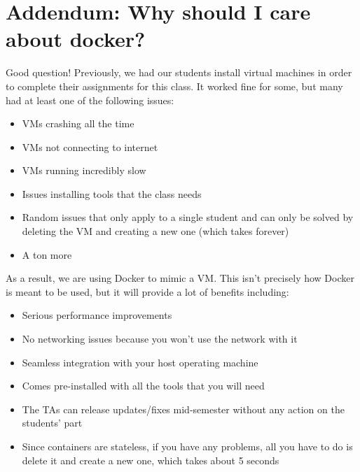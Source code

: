 \section{Addendum: Why should I care about docker?}

Good question! Previously, we had our students install virtual machines in order to complete their assignments for this class. It worked fine for some, but many had at least one of the following issues:

\begin{itemize}
  \item VMs crashing all the time
  \item VMs not connecting to internet
  \item VMs running incredibly slow
  \item Issues installing tools that the class needs
  \item Random issues that only apply to a single student and can only be solved by deleting the VM and creating a new one (which takes forever)
  \item A ton more
\end{itemize}

As a result, we are using Docker to mimic a VM. This isn't precisely how Docker is meant to be used, but it will provide a lot of benefits including:

\begin{itemize}
  \item Serious performance improvements
  \item No networking issues because you won’t use the network with it
  \item Seamless integration with your host operating machine
  \item Comes pre-installed with all the tools that you will need
  \item The TAs can release updates/fixes mid-semester without any action on the students' part
  \item Since containers are stateless, if you have any problems, all you have to do is delete it and create a new one, which takes about 5 seconds
\end{itemize}

